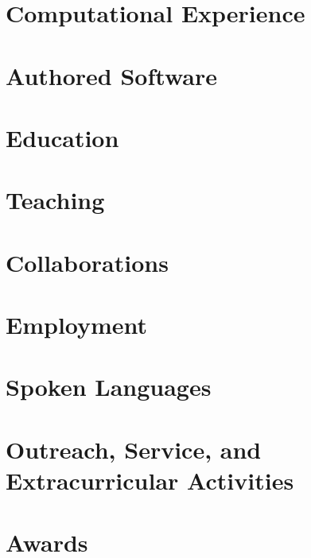 \documentclass[10pt,letterpaper,roman]{moderncv} %
\begin{document}
% 
\makecvtitle %

\section{Computational Experience}


\section{Authored Software}


\section{Education}


\section{Teaching}


\section{Collaborations}


\section{Employment}


\section{Spoken Languages}


\section{Outreach, Service, and Extracurricular Activities}


\section{Awards}



\end{document}
